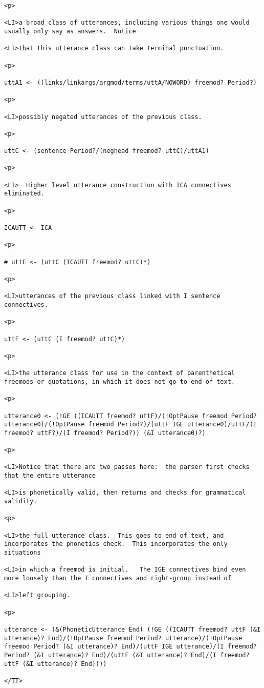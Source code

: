 \documentclass[12pt]{article}
\begin{document}
\begin{lstlisting}
<p>

<LI>a broad class of utterances, including various things one would usually only say as answers.  Notice

<LI>that this utterance class can take terminal punctuation.

<p>

uttA1 <- ((links/linkargs/argmod/terms/uttA/NOWORD) freemod? Period?)

<p>

<LI>possibly negated utterances of the previous class.

<p>

uttC <- (sentence Period?/(neghead freemod? uttC)/uttA1)

<p>

<LI>  Higher level utterance construction with ICA connectives eliminated.

<p>

ICAUTT <- ICA

<p>

# uttE <- (uttC (ICAUTT freemod? uttC)*)

<p>

<LI>utterances of the previous class linked with I sentence connectives.

<p>

uttF <- (uttC (I freemod? uttC)*)

<p>

<LI>the utterance class for use in the context of parenthetical freemods or quotations, in which it does not go to end of text.

<p>

utterance0 <- (!GE ((ICAUTT freemod? uttF)/(!OptPause freemod Period? utterance0)/(!OptPause freemod Period?)/(uttF IGE utterance0)/uttF/(I freemod? uttF?)/(I freemod? Period?)) (&I utterance0)?)

<p>

<LI>Notice that there are two passes here:  the parser first checks that the entire utterance

<LI>is phonetically valid, then returns and checks for grammatical validity.

<p>

<LI>the full utterance class.  This goes to end of text, and incorporates the phonetics check.  This incorporates the only situations

<LI>in which a freemod is initial.   The IGE connectives bind even more loosely than the I connectives and right-group instead of

<LI>left grouping.

<p>

utterance <- (&(PhoneticUtterance End) (!GE ((ICAUTT freemod? uttF (&I utterance)? End)/(!OptPause freemod Period? utterance)/(!OptPause freemod Period? (&I utterance)? End)/(uttF IGE utterance)/(I freemod? Period? (&I utterance)? End)/(uttF (&I utterance)? End)/(I freemod? uttF (&I utterance)? End))))

</TT>



\end{lstlisting}
\end{document}
